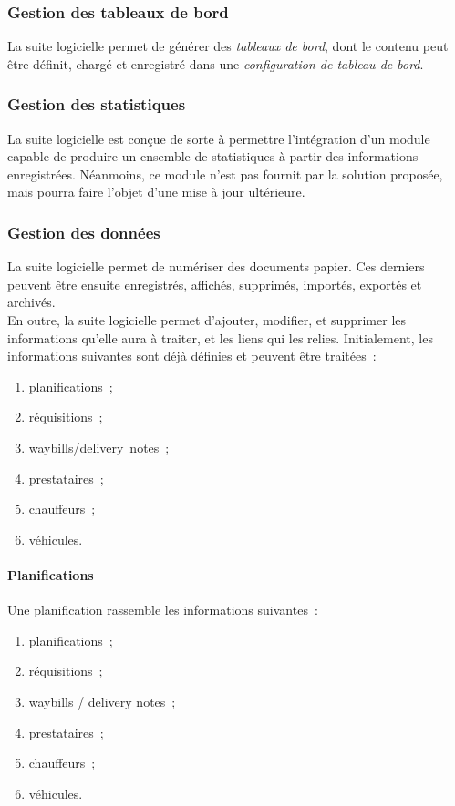 \subsubsection{Gestion des tableaux de bord}
La suite logicielle permet de générer des \emph{tableaux de bord}, dont le contenu peut être définit, chargé et enregistré dans une \emph{configuration de tableau de bord}.

\subsubsection{Gestion des statistiques}
La suite logicielle est conçue de sorte à permettre l'intégration d'un module capable de produire un ensemble de statistiques à partir des informations enregistrées. Néanmoins, ce module n'est pas fournit par la solution proposée, mais pourra faire l'objet d'une mise à jour ultérieure.

\subsubsection{Gestion des données}
La suite logicielle permet de numériser des documents papier. Ces derniers peuvent être ensuite enregistrés, affichés, supprimés, importés, exportés et archivés.
\\
En outre, la suite logicielle permet d'ajouter, modifier, et supprimer les informations qu'elle aura à traiter, et les liens qui les relies. Initialement, les informations suivantes sont déjà définies et peuvent être traitées~:
\begin{enumerate}
	\item planifications~;
	\item réquisitions~;
	\item waybills/delivery~notes~;
	\item prestataires~;
	\item chauffeurs~;
	\item véhicules.
\end{enumerate}

\paragraph{Planifications}
Une planification rassemble les informations suivantes~:
\begin{enumerate}
	\item planifications~;
	\item réquisitions~;
	\item waybills / delivery notes~;
	\item prestataires~;
	\item chauffeurs~;
	\item véhicules.
\end{enumerate}

